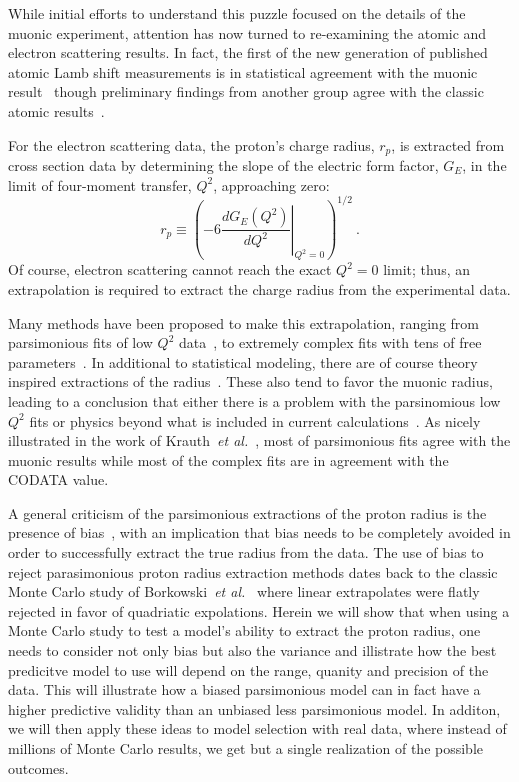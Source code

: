 \documentclass[10pt,aps,prc,twocolumn]{revtex4-1}
\begin{document}
While initial efforts to understand this puzzle focused on the details of the muonic experiment, attention has
now turned to re-examining the atomic and electron scattering results.   In fact, the first of the
new generation of published atomic Lamb shift measurements is in statistical agreement with the muonic 
result~\cite{Beyer79} though preliminary findings from another group agree with the classic atomic 
results~\cite{fleurbaey:tel-01633631}.

For the electron scattering data, the proton's charge radius, $r_p$, is extracted from
cross section data by determining the slope of the electric form factor, $G_E$, in the
limit of four-moment transfer, $Q^2$, approaching zero: 
\begin{equation}
\label{eq:radius}
  r_p \equiv %
    \left( -6  \left. \frac{dG_E(Q^2)}{dQ^2}
    \right|_{Q^{2}=0} \right)^{1/2} \>.
\end{equation}
Of course, electron scattering cannot reach the exact $Q^2 = 0$ limit; thus,
an extrapolation is required to extract the charge radius from the experimental data.

Many methods have been proposed to make this extrapolation,
ranging from parsimonious fits of low $Q^2$ data~\cite{Rosenfelder:1999cd,Griffioen:2015hta,Horbatsch:2015qda,Higinbotham:2015rja},
to extremely complex fits with tens of free parameters~\cite{Bernauer:2010wm,Bernauer:2013tpr,Lee:2015jqa,Graczyk:2014lba,Lorenz:2014vha}.
In additional to statistical modeling, there are of course 
theory inspired extractions of the radius~\cite{Belushkin:2006qa,Horbatsch:2016ilr}.   These also tend to favor the 
muonic radius, leading to a conclusion that either there is a problem with the parsinomious low $Q^2$ fits or physics beyond
what is included in current calculations~\cite{Carlson:2015jba,Liu:2016qwd}.
As nicely illustrated in the work of Krauth~{\it{et al.}}~\cite{Krauth:2017ijq}, most of 
parsimonious fits agree with the muonic results while most of the complex fits 
are in agreement with the CODATA value.   


A general criticism of the parsimonious extractions of the proton radius is the presence of bias~\cite{Sick:2017aor,Sick:2018fzn},
with an implication that bias needs to be completely avoided in order to successfully extract the true radius from the data.
The use of bias to reject parasimonious proton radius extraction methods dates back to the classic Monte Carlo 
study of Borkowski~{\it{et al.}}~\cite{Borkowski:1975} where linear extrapolates were flatly rejected in favor of quadriatic
expolations.  Herein we will show that when using a Monte Carlo study to test a model's ability
to extract the proton radius, one needs to consider not only bias but also the variance and illistrate how 
the best predicitve model to use will depend on the range, quanity and precision of the data.
This will illustrate how a biased parsimonious model can in fact have a higher predictive 
validity than an unbiased less parsimonious model.   In additon, we will then apply these ideas to model selection with real
data, where instead of millions of Monte Carlo results, we get but a single realization of the possible outcomes.  
\end{document}
